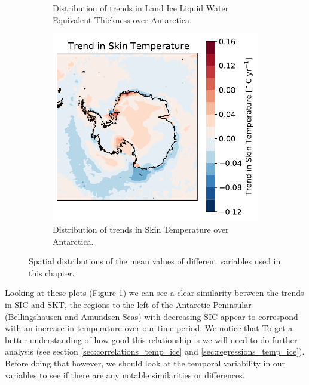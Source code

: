 \documentclass[../main.tex]{subfiles}
\begin{document}
\begin{figure}[h!]
\begin{subfigure}[h!]{0.49\textwidth}
\caption{Distribution of trends in Land Ice Liquid Water Equivalent Thickness over Antarctica.}
\end{subfigure}
\begin{subfigure}[h!]{0.49\textwidth}
\includegraphics[width=\textwidth]{images/week8/hres/trend_skt_distribution}
\caption{Distribution of trends in Skin Temperature over Antarctica.}
\end{subfigure}
\caption{Spatial distributions of the mean values of different variables used in this chapter.}
\label{fig:trend_distributions}
\end{figure}

Looking at these plots (Figure \ref{fig:trend_distributions}) we can see a clear similarity between the trends in SIC and SKT, the regions to the left of the Antarctic Peninsular (Bellingshausen and Amundsen Seas) with decreasing SIC appear to correspond with an increase in temperature over our time period.
We notice that
To get a better understanding of how good this relationship is we will need to do further analysis (see section \ref{sec:correlations_temp_ice} and \ref{sec:regressions_temp_ice}). Before doing that however, we should look at the temporal variability in our variables to see if there are any notable similarities or differences.
\end{document}
